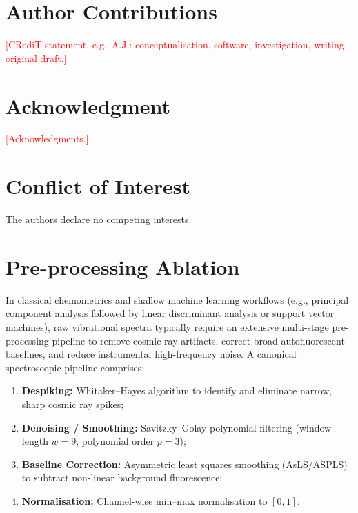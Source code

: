 \documentclass[journal,onecolumn]{IEEEtran}
\newcommand{\TBD}[1]{\textcolor{red}{[#1]}}
\begin{document}
\section*{Author Contributions}
\TBD{CRediT statement, e.g.\ A.J.: conceptualisation, software,
investigation, writing -- original draft.}

\section*{Acknowledgment}
\TBD{Acknowledgments.}

\section*{Conflict of Interest}
The authors declare no competing interests.




\appendices
\section{Pre-processing Ablation}
\label{app:preproc}

In classical chemometrics and shallow machine learning workflows (e.g.,
principal component analysis followed by linear discriminant analysis or
support vector machines), raw vibrational spectra typically require an extensive
multi-stage pre-processing pipeline to remove cosmic ray artifacts, correct
broad autofluorescent baselines, and reduce instrumental high-frequency noise.
A canonical spectroscopic pipeline comprises:
\begin{enumerate}
  \item \textbf{Despiking:} Whitaker--Hayes algorithm to identify and eliminate
        narrow, sharp cosmic ray spikes;
  \item \textbf{Denoising / Smoothing:} Savitzky--Golay polynomial filtering
        (window length $w=9$, polynomial order $p=3$);
  \item \textbf{Baseline Correction:} Asymmetric least squares smoothing
        (AsLS/ASPLS) to subtract non-linear background fluorescence;
  \item \textbf{Normalisation:} Channel-wise min--max normalisation to $[0, 1]$.
\end{enumerate}
\end{document}
